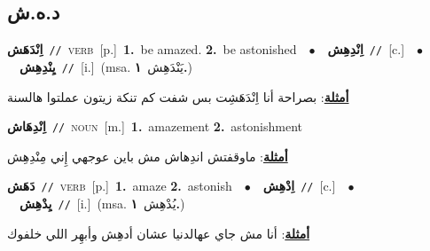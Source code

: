 \documentclass[10pt,a4paper,twoside]{article} %
\begin{document}
\begin{multicols}{2}
\vspace{-3mm}
\subsection*{\color{blue}\foreignlanguage{arabic}{د.ه.ش}\color{blue}{}} 

{\setlength\topsep{0pt}\textbf{\foreignlanguage{arabic}{اِنْدَهَش}}\ {\color{gray}\texttt{//}\color{black}}\ \textsc{verb}\ [p.]\ \textbf{1.}~be amazed.  \textbf{2.}~be astonished\ \ $\bullet$\ \ \setlength\topsep{0pt}\textbf{\foreignlanguage{arabic}{اِنْدِهِش}}\ {\color{gray}\texttt{//}\color{black}}\ [c.]\ \ $\bullet$\ \ \setlength\topsep{0pt}\textbf{\foreignlanguage{arabic}{يِنْدِهِش}}\ {\color{gray}\texttt{//}\color{black}}\ [i.]\ \color{gray}(msa. \foreignlanguage{arabic}{يَنْدَهِش}~\foreignlanguage{arabic}{\textbf{١.}})\color{black}\  \begin{flushright}\color{gray}\foreignlanguage{arabic}{\textbf{\underline{\foreignlanguage{arabic}{أمثلة}}}: بصراحة أنا اِنْدَهَشِت بس شفت كم تنكة زيتون عملتوا هالسنة}\end{flushright}\color{black}} \vspace{2mm}

{\setlength\topsep{0pt}\textbf{\foreignlanguage{arabic}{اِنْدِهَاش}}\ {\color{gray}\texttt{//}\color{black}}\ \textsc{noun}\ [m.]\ \textbf{1.}~amazement  \textbf{2.}~astonishment\  \begin{flushright}\color{gray}\foreignlanguage{arabic}{\textbf{\underline{\foreignlanguage{arabic}{أمثلة}}}: ماوقفتش اندِهاش مش باين عوجهي إِني مِنْدِهِش}\end{flushright}\color{black}} \vspace{2mm}

{\setlength\topsep{0pt}\textbf{\foreignlanguage{arabic}{دَهَش}}\ {\color{gray}\texttt{//}\color{black}}\ \textsc{verb}\ [p.]\ \textbf{1.}~amaze  \textbf{2.}~astonish\ \ $\bullet$\ \ \setlength\topsep{0pt}\textbf{\foreignlanguage{arabic}{اِدْهِش}}\ {\color{gray}\texttt{//}\color{black}}\ [c.]\ \ $\bullet$\ \ \setlength\topsep{0pt}\textbf{\foreignlanguage{arabic}{يِدْهِش}}\ {\color{gray}\texttt{//}\color{black}}\ [i.]\ \color{gray}(msa. \foreignlanguage{arabic}{يُدْهِش}~\foreignlanguage{arabic}{\textbf{١.}})\color{black}\  \begin{flushright}\color{gray}\foreignlanguage{arabic}{\textbf{\underline{\foreignlanguage{arabic}{أمثلة}}}: أنا مش جاي عهالدنيا عشان أدهِش وأبهِر اللي خلفوك}\end{flushright}\color{black}} \vspace{2mm}


\end{multicols}
\end{document}
